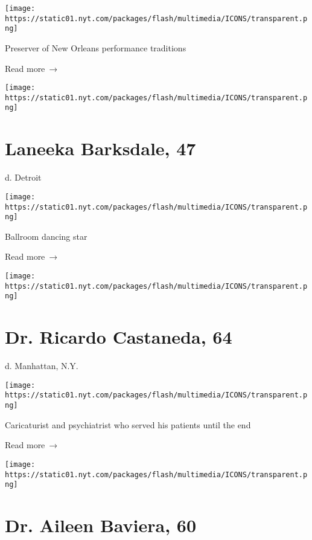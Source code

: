 \texttt{[image: https://static01.nyt.com/packages/flash/multimedia/ICONS/transparent.png]}

Preserver of New Orleans performance traditions

 Read more~→

\href{https://www.nytimes.com/2020/04/09/us/laneeka-barksdale-dead-coronavirus.html}{}

\texttt{[image: https://static01.nyt.com/packages/flash/multimedia/ICONS/transparent.png]}

\hypertarget{laneeka-barksdale-47}{%
\section{Laneeka Barksdale, 47}\label{laneeka-barksdale-47}}

d. Detroit

\texttt{[image: https://static01.nyt.com/packages/flash/multimedia/ICONS/transparent.png]}

Ballroom dancing star

 Read more~→

\href{https://www.nytimes.com/2020/04/09/obituaries/ricardo-castaneda-dead-coronavirus.html}{}

\texttt{[image: https://static01.nyt.com/packages/flash/multimedia/ICONS/transparent.png]}

\hypertarget{dr-ricardo-castaneda-64}{%
\section{Dr. Ricardo Castaneda, 64}\label{dr-ricardo-castaneda-64}}

d. Manhattan, N.Y.

\texttt{[image: https://static01.nyt.com/packages/flash/multimedia/ICONS/transparent.png]}

Caricaturist and psychiatrist who served his patients until the end

 Read more~→

\href{https://www.nytimes.com/2020/04/09/obituaries/aileen-baviera-dead-coronavirus.html}{}

\texttt{[image: https://static01.nyt.com/packages/flash/multimedia/ICONS/transparent.png]}

\hypertarget{dr-aileen-baviera-60}{%
\section{Dr. Aileen Baviera, 60}\label{dr-aileen-baviera-60}}

